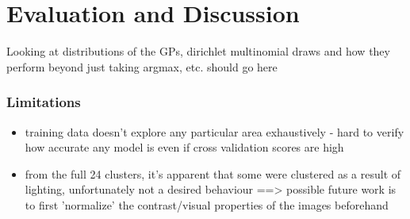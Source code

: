 \chapter{Evaluation and Discussion} \label{chap:evaluation}

 Looking at distributions of the GPs, dirichlet multinomial draws and how they perform beyond just taking argmax, etc. should go here

\subsection{Limitations}

\begin{itemize}
    \item training data doesn't explore any particular area exhaustively - hard to verify how accurate any model is even if cross validation scores are high
    \item from the full 24 clusters, it's apparent that some were clustered as a result of lighting, unfortunately not a desired behaviour ==> possible future work is to first 'normalize' the contrast/visual properties of the images beforehand 
\end{itemize}
